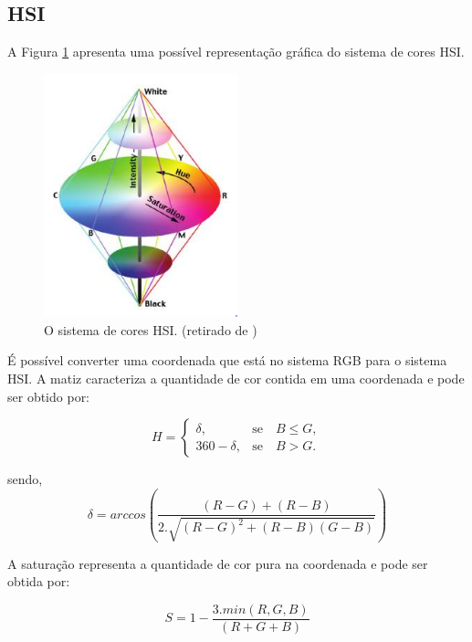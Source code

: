 \documentclass[	12pt, Times, openright, twoside, a4paper, english, brazil]{abntex2}
\begin{document}
\subsection{HSI}

A Figura \ref{fig:figuraHSI} apresenta uma possível representação gráfica do sistema de cores HSI.

\begin{figure}[!htb]
\centering \includegraphics[width=0.5\textwidth]{figuraHSI.png}
\caption{O sistema de cores HSI. (retirado de ) \label{fig:figuraHSI}}
\end{figure}

É possível converter uma coordenada que está no sistema RGB para o sistema HSI. A matiz caracteriza a quantidade de cor contida em uma coordenada e pode ser obtido por:

\begin{equation}
H=\left\{\begin{array}{rc}
\delta,&\mbox{se}\quad B\leq G,\\
360 - \delta, &\mbox{se}\quad B>G.
\end{array}\right.
\end{equation}

sendo,
\begin{equation}
\delta = arccos \left( \frac{(R - G) + (R - B)}{2  .  \sqrt{(R-G)^2 + (R-B)(G-B)} } \right)
\end{equation}
 
A saturação representa a quantidade de cor pura na coordenada e pode ser obtida por: 

\begin{equation}
S = 1 -  \frac{3 . min(R, G, B)}{(R+G+B)} 
\end{equation}
\end{document}
